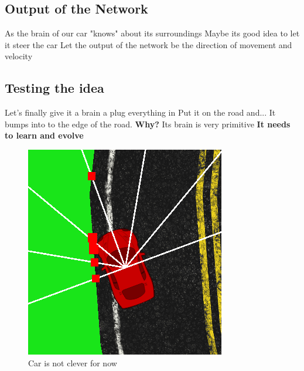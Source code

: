 \documentclass[10pt,a4paper]{article}
\begin{document}
\subsection{Output of the Network}
As the brain of our car "knows" about its surroundings
Maybe its good idea to let it steer the car
Let the output of the network be the direction of movement and velocity 
\subsection{Testing the idea}
Let's finally give it a brain a plug everything in
Put it on the road and...
It bumps into to the edge of the road. \textbf{Why?}
Its brain is very primitive \textbf{It needs to learn and evolve} 
\begin{figure}[!h]
	\centering
    \includegraphics[scale=0.5]{cardump.png}
	\centering
    \caption{\tiny Car is not clever for now}
\end{figure}
\end{document}

